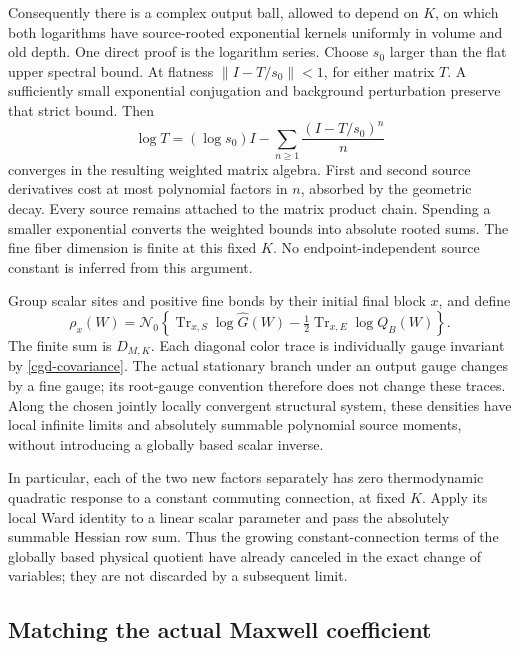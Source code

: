 Consequently there is a complex output ball, allowed
to depend on \(K\), on which both logarithms have
source-rooted exponential kernels uniformly in volume
and old depth. One direct proof is the logarithm series.
Choose \(s_0\) larger than the flat upper spectral bound.
At flatness \(\|I-T/s_0\|<1\), for either matrix \(T\).
A sufficiently small exponential conjugation and
background perturbation preserve that strict bound.
Then
\[
 \log T=(\log s_0)I-
       \sum_{n\ge1}\frac{(I-T/s_0)^n}{n}
\]
converges in the resulting weighted matrix algebra.
First and second source derivatives cost at most
polynomial factors in \(n\), absorbed by the geometric
decay. Every source remains attached to the matrix
product chain. Spending a smaller exponential converts
the weighted bounds into absolute rooted sums.
The fine fiber dimension is finite at this fixed \(K\).
No endpoint-independent source constant is inferred
from this argument.

Group scalar sites and positive fine bonds by their
initial final block \(x\), and define
\begin{equation}
 \rho_x(W)=\mathcal N_0\left\{
  \operatorname{Tr}_{x,S}\log\widehat G(W)
       -\tfrac12\operatorname{Tr}_{x,E}\log Q_B(W)\right\}.
 \label{cgd-density}
\end{equation}
The finite sum is \(D_{M,K}\). Each diagonal color
trace is individually gauge invariant by
\eqref{cgd-covariance}. The actual stationary branch
under an output gauge changes by a fine gauge; its
root-gauge convention therefore does not change these
traces. Along the chosen jointly locally convergent structural
system, these densities have local infinite limits
and absolutely summable polynomial source moments,
without introducing a globally based scalar inverse.

In particular, each of the two new factors separately
has zero thermodynamic quadratic response to a
constant commuting connection, at fixed \(K\).
Apply its local Ward identity to a linear scalar
parameter and pass the absolutely summable Hessian
row sum. Thus the growing constant-connection terms
of the globally based physical quotient have
already canceled in the exact change of variables;
they are not discarded by a subsequent limit.

\subsection{Matching the actual Maxwell coefficient}
\label{cgd-Maxwell-section}

